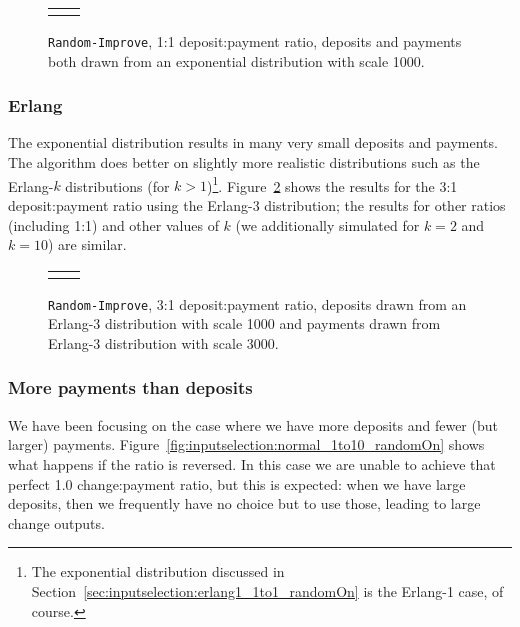 \documentclass{article}
\theoremstyle{definition}{
  \newtheorem{lemma}{Lemma}[section] %
  \newtheorem{definition}[lemma]{Definition}
}
\theoremstyle{theorem}{
  \newtheorem{invariant}[lemma]{Invariant}
  \newtheorem{proofobligation}[lemma]{Proof Obligation}
}
\numberwithin{equation}{lemma}
\begin{document}
\begin{figure}[p]
\begin{center}
\scriptsize
\begin{tabular}{ll}
 &

\end{tabular}
\end{center}
\caption{\label{fig:inputselection:erlang1_1to1_randomOn}
  \texttt{Random-Improve}, 1:1 deposit:payment ratio, deposits and payments
  both drawn from an exponential distribution with scale 1000.
}
\end{figure}

\subsubsection{Erlang}

The exponential distribution results in many very small deposits and payments.
The algorithm does better on slightly more realistic distributions such as the
Erlang-$k$ distributions (for $k > 1$)\footnote{The exponential distribution
discussed in Section~\ref{sec:inputselection:erlang1_1to1_randomOn} is the
Erlang-1 case, of course.}.
Figure~\ref{fig:inputselection:erlang3_3to1_randomOn} shows the results for the
3:1 deposit:payment ratio using the Erlang-3 distribution; the results for other
ratios (including 1:1) and other values of $k$ (we additionally simulated for $k =
2$ and $k = 10$) are similar.

\begin{figure}[p]
\begin{center}
\scriptsize
\begin{tabular}{ll}
 &

\end{tabular}
\end{center}
\caption{\label{fig:inputselection:erlang3_3to1_randomOn}
  \texttt{Random-Improve}, 3:1 deposit:payment ratio, deposits
  drawn from an Erlang-3 distribution with scale 1000 and payments drawn from
  Erlang-3 distribution with scale 3000.
}
\end{figure}

\subsubsection{More payments than deposits}

We have been focusing on the case where we have more deposits and fewer (but
larger) payments. Figure~\ref{fig:inputselection:normal_1to10_randomOn} shows
what happens if the ratio is reversed. In this case we are unable to achieve
that perfect 1.0 change:payment ratio, but this is expected: when we have large
deposits, then we frequently have no choice but to use those, leading to large
change outputs.
\end{document}
